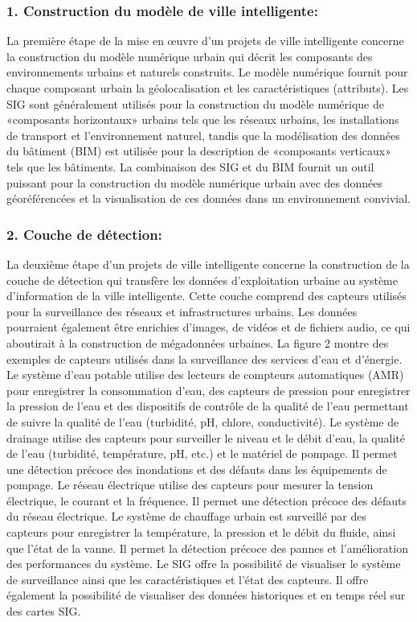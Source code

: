 \documentclass[french, a4paper, 12pt]{report}
\begin{document}
\subsubsection{1. Construction du modèle de ville intelligente:}
La première étape de la mise en œuvre d’un projets de ville intelligente concerne la construction du modèle numérique urbain qui décrit les composants des environnements urbains et naturels construits. Le modèle numérique fournit pour chaque composant urbain la géolocalisation et les caractéristiques (attributs). Les SIG sont généralement utilisés pour la construction du modèle numérique de «composants horizontaux» urbains tels que les réseaux urbains, les installations de transport et l’environnement naturel, tandis que la modélisation des données du bâtiment (BIM) est utilisée pour la description de «composants verticaux» tels que les bâtiments. La combinaison des SIG et du BIM fournit un outil puissant pour la construction du modèle numérique urbain avec des données géoréférencées et la visualisation de ces données dans un environnement convivial.
\subsubsection{2. Couche de détection:}
La deuxième étape d’un projets de ville intelligente concerne la construction de la couche de détection qui transfère les données d’exploitation urbaine au système d’information de la ville intelligente. Cette couche comprend des capteurs utilisés pour la surveillance des réseaux et infrastructures urbains. Les données pourraient également être enrichies d'images, de vidéos et de fichiers audio, ce qui aboutirait à la construction de mégadonnées urbaines. La figure 2 montre des exemples de capteurs utilisés dans la surveillance des services d'eau et d'énergie. Le système d'eau potable utilise des lecteurs de compteurs automatiques (AMR) pour enregistrer la consommation d'eau, des capteurs de pression pour enregistrer la pression de l'eau et des dispositifs de contrôle de la qualité de l'eau permettant de suivre la qualité de l'eau (turbidité, pH, chlore, conductivité). Le système de drainage utilise des capteurs pour surveiller le niveau et le débit d'eau, la qualité de l'eau (turbidité, température, pH, etc.) et le matériel de pompage. Il permet une détection précoce des inondations et des défauts dans les équipements de pompage. Le réseau électrique utilise des capteurs pour mesurer la tension électrique, le courant et la fréquence. Il permet une détection précoce des défauts du réseau électrique. Le système de chauffage urbain est surveillé par des capteurs pour enregistrer la température, la pression et le débit du fluide, ainsi que l'état de la vanne. Il permet la détection précoce des pannes et l'amélioration des performances du système. Le SIG offre la possibilité de visualiser le système de surveillance ainsi que les caractéristiques et l’état des capteurs. Il offre également la possibilité de visualiser des données historiques et en temps réel sur des cartes SIG.
\end{document}
